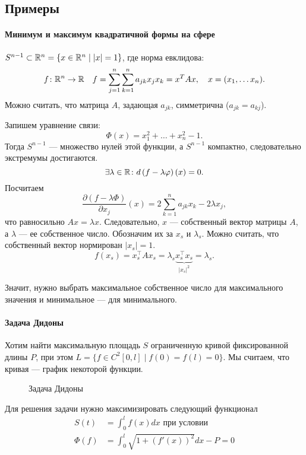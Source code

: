 \subsection{Примеры}
\paragraph{Минимум и максимум квадратичной формы на сфере}
$ S^{n-1} \subset \mathbb{R}^{n} = \{x \in \mathbb{R}^{n} \mid \lvert x \rvert = 1\}$, где норма евклидова:
\[
    f\colon \mathbb{R}^{n} \to  \mathbb{R} \quad f = \sum_{j=1}^{n} \sum_{k=1}^{n} a_{jk} x_j x_k = x^{T}Ax, \quad x = (x_1, \ldots x_{n})
.\] 
Можно считать, что матрица $ A$, задающая $ a_{jk}$, симметрична ($ a_{jk} = a_{kj}$).

Запишем уравнение связи:
\[
    \Phi (x) = x_1^2 + \ldots + x_{n}^2 - 1
.\] 
Тогда $ S^{n-1}$ --- множество нулей этой функции, а $ S^{n-1}$ компактно, следовательно экстремумы достигаются. 
\[
    \exists \lambda \in  \mathbb{R}\colon d\left( f- \lambda \varphi  \right) (x) = 0
.\] 
Посчитаем
\[
    \frac{\partial (f-\lambda \Phi )}{\partial  x_j} (x) =  2 \sum_{k=1}^{n} a_{jk} x_k - 2 \lambda x_j
,\] 
что равносильно $ Ax = \lambda x$.
Следовательно, $ x $ --- собственный вектор матрицы $ A$, а  $ \lambda$ --- ее собственное число.
Обозначим их за $ x_s$ и  $ \lambda _s$.
Можно считать, что собственный вектор нормирован $ \lvert x_s  \rvert = 1$.
\[
	f(x_s) = x_s^{\top}A x_s = \lambda_s \underbrace{x_s^{\top}x_s}_{\lvert x_s \rvert ^2} = \lambda _s
.\] 

Значит, нужно выбрать максимальное собственное число для максимального значения и минимальное  --- для минимального.

\paragraph{Задача Дидоны}
Хотим найти максимальную площадь $ S$ ограниченную кривой фиксированной длины $ P$, при этом $ L = \{f \in C^{2}[0, l] \mid f(0) = f(l) = 0\}$.
Мы считаем, что кривая --- график некоторой функции.

\begin{figure}[ht]
    \centering
    \caption{Задача Дидоны}
    \label{fig:didiona}
\end{figure}

Для решения задачи нужно максимизировать следующий функционал
\begin{align*}
	S(t) &= \int_{0}^{l} f(x) dx  \text{ при условии}\\
    \Phi(f) &= \int_{0}^{l} \sqrt{1+ (f'(x))^2 } dx - P = 0
\end{align*}


